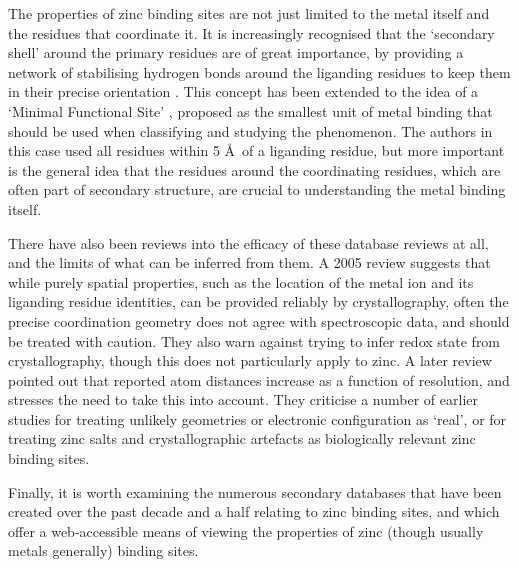 The properties of zinc binding sites are not just limited to the metal itself and the residues that coordinate it. It is increasingly recognised that the `secondary shell' around the primary residues are of great importance, by providing a network of stabilising hydrogen bonds around the liganding residues to keep them in their precise orientation \cite{auld2001zinc}. This concept has been extended to the idea of a `Minimal Functional Site' \cite{andreini2011minimal}, proposed as the smallest unit of metal binding that should be used when classifying and studying the phenomenon. The authors in this case used all residues within 5 \AA \ of a liganding residue, but more important is the general idea that the residues around the coordinating residues, which are often part of secondary structure, are crucial to understanding the metal binding itself.

There have also been reviews into the efficacy of these database reviews at all, and the limits of what can be inferred from them. A 2005 review \cite{sommerhalter2005x} suggests that while purely spatial properties, such as the location of the metal ion and its liganding residue identities, can be provided reliably by crystallography, often the precise coordination geometry does not agree with spectroscopic data, and should be treated with caution. They also warn against trying to infer redox state from crystallography, though this does not particularly apply to zinc. A later review \cite{laitaoja2013zinc} pointed out that reported atom distances increase as a function of resolution, and stresses the need to take this into account. They criticise a number of earlier studies for treating unlikely geometries or electronic configuration as `real', or for treating zinc salts and crystallographic artefacts as biologically relevant zinc binding sites.

Finally, it is worth examining the numerous secondary databases that have been created over the past decade and a half relating to zinc binding sites, and which offer a web-accessible means of viewing the properties of zinc (though usually metals generally) binding sites.

